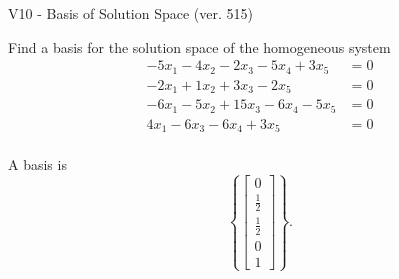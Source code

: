 \begin{exercise}
  \begin{exerciseTitle}V10 - Basis of Solution Space (ver. 515)\end{exerciseTitle}
  \begin{exerciseStatement}
    Find a basis for the solution space of the homogeneous system 
\begin{align*}
 -5 x_ 1 -4 x_ 2 -2 x_ 3 -5 x_ 4 + 3 x_ 5 &= 0  \\ 
  -2 x_ 1 + 1 x_ 2 + 3 x_ 3 -2 x_ 5 &= 0  \\ 
  -6 x_ 1 -5 x_ 2 + 15 x_ 3 -6 x_ 4 -5 x_ 5 &= 0  \\ 
  4 x_ 1 -6 x_ 3 -6 x_ 4 + 3 x_ 5 &= 0  \\ 
 \end{align*}


 
  \end{exerciseStatement}

  \begin{exerciseAnswer}
   A basis is   
\[\left\{\left[\begin{array}{c}
0 \\
\frac{1}{2} \\
\frac{1}{2} \\
0 \\
1
\end{array}\right]\right\}.\]

  


  \end{exerciseAnswer}
\end{exercise}